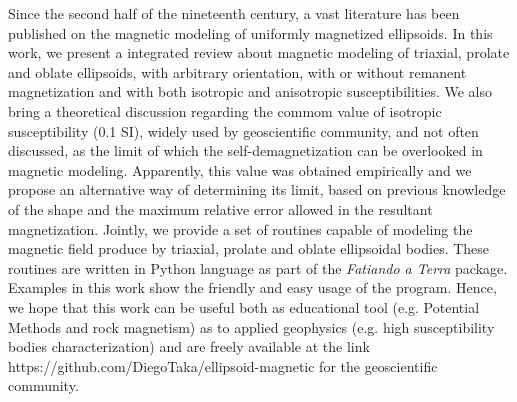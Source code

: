 \begin{foreignabstract}

Since the second half of the nineteenth century, a vast literature has been published on the magnetic modeling of uniformly magnetized ellipsoids. In this work, we present a integrated review about magnetic modeling of triaxial, prolate and oblate ellipsoids, with arbitrary orientation, with or without remanent magnetization and with both isotropic and anisotropic susceptibilities. We also bring a theoretical discussion regarding the commom value of isotropic susceptibility (0.1 SI), widely used by geoscientific community, and not often discussed, as the limit of which the self-demagnetization can be overlooked in magnetic modeling. Apparently, this value was obtained empirically and we propose an alternative way of determining its limit, based on previous knowledge of the shape and the maximum relative error allowed in the resultant magnetization. Jointly, we provide a set of routines capable of modeling the magnetic field produce by triaxial, prolate and oblate ellipsoidal bodies. These routines are written in Python language as part of the \textit{Fatiando a Terra} package. Examples in this work show the friendly and easy usage of the program. Hence, we hope that this work can be useful both as educational tool (e.g. Potential Methods and rock magnetism) as to applied geophysics (e.g. high susceptibility bodies characterization) and are freely available at the link https://github.com/DiegoTaka/ellipsoid-magnetic for the geoscientific community.

\end{foreignabstract}